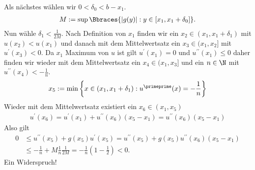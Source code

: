 \begin{solution}
\begin{enumerate}[label = (\roman*)]
    Als nächstes wählen wir $0 < \delta_0 < b - x_1$.
    \begin{align*}
    M := \sup\Bbraces{|g(y)|: y \in [x_1,x_1 + \delta_0]}.
    \end{align*}
    Nun wähle $\delta_1 < \frac{1}{2M}$.
    Nach Definition von $x_1$ finden wir ein $x_2 \in (x_1,x_1 + \delta_1)$ mit $u(x_2) < u(x_1)$ und danach mit dem Mittelwertsatz ein $x_3 \in (x_1, x_2]$ mit $u^\prime(x_3) < 0$.
    Da $x_1$ Maximum von $u$ ist gilt $u^\prime(x_1) = 0$ und $u^{\prime\prime}(x_1) \leq 0$ daher
    finden wir wieder mit dem Mittelwertsatz ein $x_4 \in (x_1, x_3]$ und ein $n \in \N$ mit $u^{\prime\prime}(x_4) < -\frac{1}{n}$.
    \begin{align*}
      x_5 := \min \left\{x \in (x_1,x_1+\delta_1): u^{\primeprime}(x) = -\frac{1}{n}\right\}
    \end{align*}
    Wieder mit dem Mittelwertsatz existiert ein $x_6 \in (x_1,x_5)$
    \begin{align*}
    u^\prime(x_6) = u^\prime(x_1) + u^{\prime\prime}(x_6) (x_5 - x_1) = u^{\prime\prime}(x_6) (x_5 - x_1)
    \end{align*}
    Also gilt
    \begin{align*}
    0 &\leq u^{\prime\prime}(x_5) + g(x_5) u^\prime (x_5)
    = u^{\prime\prime}(x_5) + g(x_5) u^{\prime\prime}(x_6)(x_5 - x_1) \\
    &\leq -\frac{1}{n} + M\frac{1}{n}\frac{1}{2M} = -\frac{1}{n}\left(1 - \frac{1}{2}\right) < 0.
    \end{align*}
    Ein Widerspruch!
	\end{enumerate}


\end{solution}

